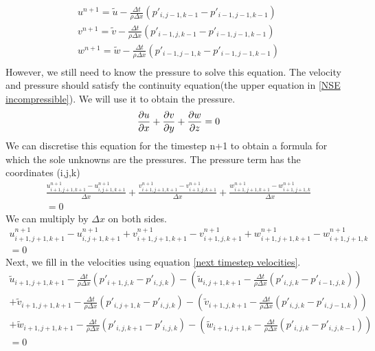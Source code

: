 \documentclass{article}
\begin{document}
\begin{equation}
  \begin{split}
    u^{n+1}=\tilde{u}-\frac{\Delta t}{\rho \Delta x}(p'_{i,j-1,k-1} - p'_{i-1,j-1,k-1})\\
    v^{n+1}=\tilde{v}-\frac{\Delta t}{\rho \Delta x}(p'_{i-1,j,k-1} - p'_{i-1,j-1,k-1})\\
    w^{n+1}=\tilde{w}-\frac{\Delta t}{\rho \Delta x}(p'_{i-1,j-1,k}- p'_{i-1,j-1,k-1})\\
  \end{split} \label{next timestep velocities}
\end{equation}
However, we still need to know the pressure to solve this equation. The velocity and pressure should satisfy the continuity equation(the upper equation in \ref{NSE incompressible}). We will use it to obtain the pressure.\cite{MAC}
\[
  \pdv{u}{x}+\pdv{v}{y}+\pdv{w}{z}=0
\]
We can discretise this equation for the timestep n+1 to obtain a formula for which the sole unknowns are the pressures. The pressure term has the coordinates (i,j,k)
\begin{equation}
  \begin{split}
    \frac{u^{n+1}_{i+1,j+1,k+1}-u^{n+1}_{i, j+1, k+1}}{\Delta x} + 
    \frac{v^{n+1}_{i+1,j+1,k+1}-v^{n+1}_{i+1, j, k+1}}{\Delta x} + 
    \frac{w^{n+1}_{i+1,j+1,k+1}-w^{n+1}_{i+1, j+1, k}}{\Delta x}\\=0 
  \end{split} \label{continuity discretised}
\end{equation}
We can multiply by \(\Delta x\) on both sides.
\[
  \begin{split}
    u^{n+1}_{i+1,j+1,k+1}-u^{n+1}_{i, j+1, k+1} + 
    v^{n+1}_{i+1,j+1,k+1}-v^{n+1}_{i+1, j, k+1} + 
    w^{n+1}_{i+1,j+1,k+1}-w^{n+1}_{i+1, j+1, k}\\=0 
  \end{split}
\]
Next, we fill in the velocities using equation \ref{next timestep velocities}.
\[
  \begin{split}
    \tilde{u}_{i+1,j+1,k+1} - \frac{\Delta t}{\rho \Delta x}(p'_{i+1,j,k}-p'_{i,j,k})
    -\left(\tilde{u}_{i, j+1, k+1} - \frac{\Delta t}{\rho \Delta x}(p'_{i,j,k}-p'_{i-1,j,k})\right)\\
    +\tilde{v}_{i+1,j+1,k+1} - \frac{\Delta t}{\rho \Delta x}(p'_{i,j+1,k}-p'_{i,j,k})
    -\left(\tilde{v}_{i+1, j, k+1} - \frac{\Delta t}{\rho \Delta x}(p'_{i,j,k}-p'_{i,j-1,k})\right)\\
    +\tilde{w}_{i+1,j+1,k+1} - \frac{\Delta t}{\rho \Delta x}(p'_{i,j,k+1}-p'_{i,j,k})
    -\left(\tilde{w}_{i+1, j+1, k} - \frac{\Delta t}{\rho \Delta x}(p'_{i,j,k}-p'_{i,j,k-1})\right)\\
    =0
  \end{split}
\]
\end{document}
